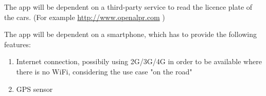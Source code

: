 The app will be dependent on a third-party service to read the licence plate of the cars. (For example \url{http://www.openalpr.com} )


The app will be dependent on a smartphone, which has to provide the following features:
\begin{enumerate}
  \item Internet connection, possibily using 2G/3G/4G in order to be available where there is no WiFi, considering the use case "on the road"
  \item GPS sensor
\end{enumerate}
